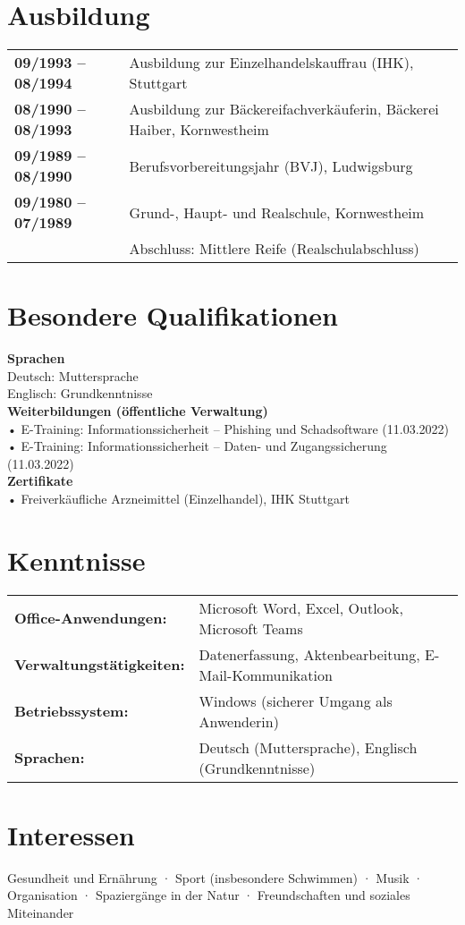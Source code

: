 \documentclass[12pt,a4paper]{article}
\begin{document}
\section*{Ausbildung}

\begin{tabular}{@{}p{4cm}p{11.5cm}@{}}
\textbf{09/1993 – 08/1994} & Ausbildung zur Einzelhandelskauffrau (IHK), Stuttgart \\
\textbf{08/1990 – 08/1993} & Ausbildung zur Bäckereifachverkäuferin, Bäckerei Haiber, Kornwestheim \\
\textbf{09/1989 – 08/1990} & Berufsvorbereitungsjahr (BVJ), Ludwigsburg \\
\textbf{09/1980 – 07/1989} & Grund-, Haupt- und Realschule, Kornwestheim \\
                           & Abschluss: Mittlere Reife (Realschulabschluss) \\
\end{tabular}



\section*{Besondere Qualifikationen}

\textbf{Sprachen} \\
Deutsch: Muttersprache \\
Englisch: Grundkenntnisse  \\[0.8em]

\textbf{Weiterbildungen (öffentliche Verwaltung)} \\
• E-Training: Informationssicherheit – Phishing und Schadsoftware (11.03.2022) \\
• E-Training: Informationssicherheit – Daten- und Zugangssicherung (11.03.2022) \\[0.8em]

\textbf{Zertifikate} \\
• Freiverkäufliche Arzneimittel (Einzelhandel), IHK Stuttgart


\section*{Kenntnisse}

\renewcommand{\arraystretch}{1.3}
\begin{tabular}{@{}p{5cm}p{10cm}@{}}
\textbf{Office-Anwendungen:} & Microsoft Word, Excel, Outlook, Microsoft Teams \\
\textbf{Verwaltungstätigkeiten:} & Datenerfassung, Aktenbearbeitung, E-Mail-Kommunikation \\
\textbf{Betriebssystem:}     & Windows (sicherer Umgang als Anwenderin) \\
\textbf{Sprachen:}           & Deutsch (Muttersprache), Englisch (Grundkenntnisse)
\end{tabular}


\section*{Interessen}

Gesundheit und Ernährung · Sport (insbesondere Schwimmen) · Musik · Organisation · Spaziergänge in der Natur · Freundschaften und soziales Miteinander
\end{document}
